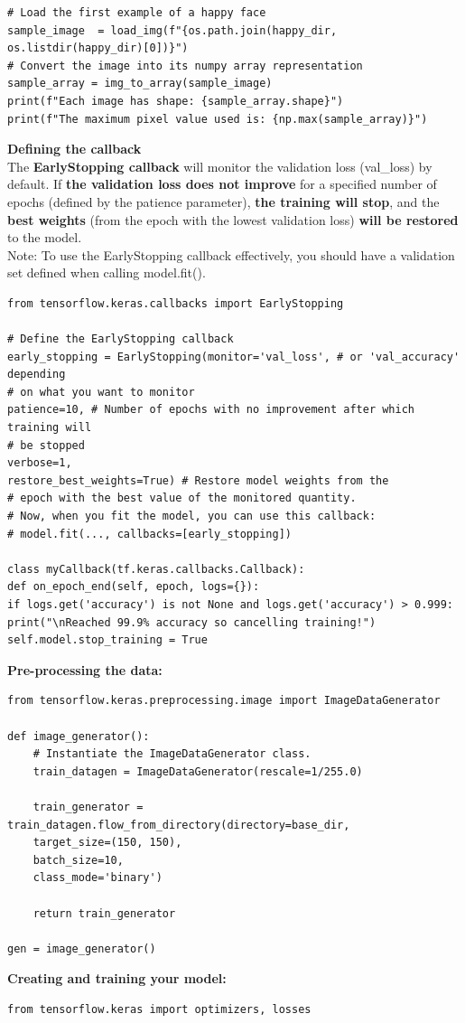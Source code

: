 \documentclass[20pt]{article}
\begin{document}
\begin{itemize}
\begin{verbatim}
# Load the first example of a happy face
sample_image  = load_img(f"{os.path.join(happy_dir, os.listdir(happy_dir)[0])}")
# Convert the image into its numpy array representation
sample_array = img_to_array(sample_image)
print(f"Each image has shape: {sample_array.shape}")
print(f"The maximum pixel value used is: {np.max(sample_array)}")
	\end{verbatim}
	\textbf{Defining the callback}\\
	The \textbf{EarlyStopping callback} will monitor the validation loss (val\_loss) by default. If \textbf{the validation loss does not improve} for a specified number of epochs (defined by the patience parameter), \textbf{the training will stop}, and the \textbf{best weights} (from the epoch with the lowest validation loss) \textbf{will be restored} to the model.\\
	Note: To use the EarlyStopping callback effectively, you should have a validation set defined when calling model.fit().
	\begin{verbatim}
from tensorflow.keras.callbacks import EarlyStopping

# Define the EarlyStopping callback
early_stopping = EarlyStopping(monitor='val_loss', # or 'val_accuracy' depending
# on what you want to monitor
patience=10, # Number of epochs with no improvement after which training will
# be stopped
verbose=1,
restore_best_weights=True) # Restore model weights from the
# epoch with the best value of the monitored quantity.
# Now, when you fit the model, you can use this callback:
# model.fit(..., callbacks=[early_stopping])

class myCallback(tf.keras.callbacks.Callback):
def on_epoch_end(self, epoch, logs={}):
if logs.get('accuracy') is not None and logs.get('accuracy') > 0.999:
print("\nReached 99.9% accuracy so cancelling training!")
self.model.stop_training = True 
	\end{verbatim}
	\textbf{Pre-processing the data:}
	\begin{verbatim}
from tensorflow.keras.preprocessing.image import ImageDataGenerator

def image_generator():
	# Instantiate the ImageDataGenerator class.
	train_datagen = ImageDataGenerator(rescale=1/255.0)
	
	train_generator = train_datagen.flow_from_directory(directory=base_dir,
	target_size=(150, 150),
	batch_size=10,
	class_mode='binary')
	
	return train_generator

gen = image_generator()
	\end{verbatim}
	\textbf{Creating and training your model:}
	\begin{verbatim}
from tensorflow.keras import optimizers, losses


\end{verbatim}
\end{itemize}
\end{document}
